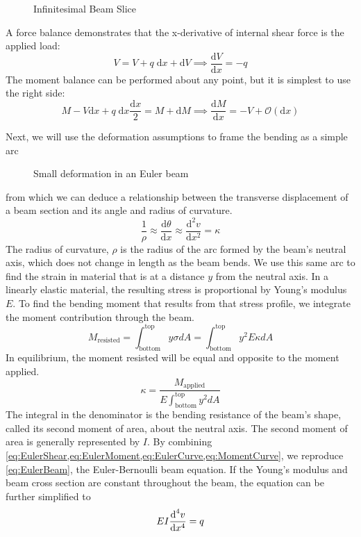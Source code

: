 %
\begin{figure}[htbp]
  \centering
  
  \caption{Infinitesimal Beam Slice}
  \label{fig:Infinitesimal}
\end{figure}
%
A force balance demonstrates that the x-derivative of internal shear force is the applied load:
\begin{equation}
\label{eq:EulerShear}
V = V + q\;\text{d}x + \text{d}V \implies \frac{\text{d}V}{\text{d}x} = -q
\end{equation}
The moment balance can be performed about any point, but it is simplest to use the right side:
\begin{equation}
\label{eq:EulerMoment}
M - V\text{d}x +q\;\text{d}x\frac{\text{d}x}{2} = M + \text{d}M \implies \frac{\text{d} M}{\text{d}x} = -V + \mathcal{O}(\text{d}x)
\end{equation}


Next, we will use the deformation assumptions to frame the bending as a simple arc
%
\begin{figure}[htbp]
  \centering
  
  \caption{Small deformation in an Euler beam}
  \label{fig:EulerBeam1}
\end{figure}
%
from which we can deduce a relationship between the transverse displacement of a beam section and its angle and radius of curvature.
\begin{equation}
 \label{eq:EulerCurve}
 \frac{1}{\rho} \approx \frac{\text{d} \theta}{\text{d} x} \approx \frac{\text{d}^2v}{\text{d}x^2} = \kappa
\end{equation}
The radius of curvature, $\rho$ is the radius of the arc formed by the beam's neutral axis, which does not change in length as the beam bends.
We use this same arc to find the strain in material that is at a distance $y$ from the neutral axis.
In a linearly elastic material, the resulting stress is proportional by Young's modulus $E$.
To find the bending moment that results from that stress profile, we integrate the moment contribution through the beam.
\begin{equation}
M_\text{resisted} = \int_\text{bottom}^\text{top}y\sigma dA = \int_\text{bottom}^\text{top}y^2 E \kappa dA
\end{equation}
In equilibrium, the moment resisted will be equal and opposite to the moment applied.
\begin{equation}
\label{eq:MomentCurve}
\kappa = \frac{M_\text{applied}}{E \int_\text{bottom}^\text{top}y^2dA}
\end{equation}
The integral in the denominator is the bending resistance of the beam's shape, called its second moment of area, about the neutral axis.
The second moment of area is generally represented by $I$.
By combining \cref{eq:EulerShear,eq:EulerMoment,eq:EulerCurve,eq:MomentCurve}, we reproduce  \cref{eq:EulerBeam}, the Euler-Bernoulli beam equation.
If the Young's modulus and beam cross section are constant throughout the beam, the equation can be further simplified to
\begin{equation}
EI\frac{\text{d}^4 v}{\text{d}x^4}=q\notag
\end{equation}

